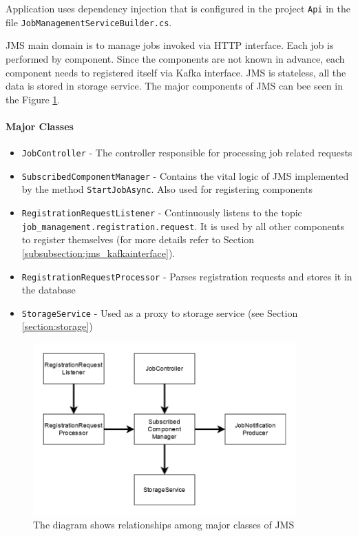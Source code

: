 Application uses dependency injection that is configured in the project \texttt{Api} in the file  \texttt{JobManagementServiceBuilder.cs}.

JMS main domain is to manage jobs invoked via HTTP interface. Each job is performed by component. Since the components are not known in advance, each component needs to registered itself via Kafka interface. JMS is stateless, all the data is stored in storage service. The major components of JMS can bee seen in the Figure \ref{figure:class-jms}.
 
\paragraph{Major Classes}

\begin{itemize}
    \item \texttt{JobController} - The controller responsible for processing job related requests
    \item \texttt{SubscribedComponentManager} - Contains the vital logic of JMS implemented by the method \texttt{StartJobAsync}. Also used for registering components
    \item \texttt{RegistrationRequestListener} - Continuously listens to the topic\\ \texttt{job\_management.registration.request}. It is used by all other components to register themselves (for more details refer to Section \ref{subsubsection:jms_kafkainterface}). 
    \item \texttt{RegistrationRequestProcessor} - Parses registration requests and stores it in the database
    \item \texttt{StorageService} - Used as a proxy to storage service (see Section \ref{section:storage})
\end{itemize}

\begin{figure}
    \centering
    \includegraphics[width=0.9\textwidth]{diagrams/class-jms.png}
    \caption{The diagram shows relationships among major classes of JMS}
    \label{figure:class-jms}
\end{figure}

